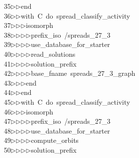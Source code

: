 \begin{tabbing}
35\>$\triangleright$\>$\triangleright$\>end\ \\[0pt]
36\>$\triangleright$\>$\triangleright$\>with\ C\ do\ spread\_classify\_activity\ \\[0pt]
37\>$\triangleright$\>$\triangleright$\>$\triangleright$\>isomorph\ \\[0pt]
38\>$\triangleright$\>$\triangleright$\>$\triangleright$\>$\triangleright$\>prefix\_iso\ /spreads\_27\_3\ \\[0pt]
39\>$\triangleright$\>$\triangleright$\>$\triangleright$\>$\triangleright$\>use\_database\_for\_starter\ \\[0pt]
40\>$\triangleright$\>$\triangleright$\>$\triangleright$\>$\triangleright$\>read\_solutions\ \\[0pt]
41\>$\triangleright$\>$\triangleright$\>$\triangleright$\>$\triangleright$\>solution\_prefix\ \ \\[0pt]
42\>$\triangleright$\>$\triangleright$\>$\triangleright$\>$\triangleright$\>base\_fname\ spreads\_27\_3\_graph\ \\[0pt]
43\>$\triangleright$\>$\triangleright$\>$\triangleright$\>end\ \\[0pt]
44\>$\triangleright$\>$\triangleright$\>end\ \\[0pt]
45\>$\triangleright$\>$\triangleright$\>with\ C\ do\ spread\_classify\_activity\ \\[0pt]
46\>$\triangleright$\>$\triangleright$\>$\triangleright$\>isomorph\ \\[0pt]
47\>$\triangleright$\>$\triangleright$\>$\triangleright$\>$\triangleright$\>prefix\_iso\ /spreads\_27\_3\ \\[0pt]
48\>$\triangleright$\>$\triangleright$\>$\triangleright$\>$\triangleright$\>use\_database\_for\_starter\ \\[0pt]
49\>$\triangleright$\>$\triangleright$\>$\triangleright$\>$\triangleright$\>compute\_orbits\ \\[0pt]
50\>$\triangleright$\>$\triangleright$\>$\triangleright$\>$\triangleright$\>solution\_prefix\ \ \\[0pt]

\end{tabbing}
